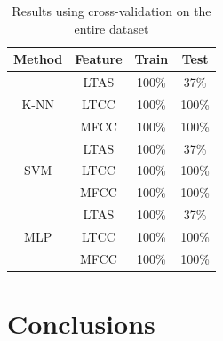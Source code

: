\documentclass[letterpaper,11pt,leqno]{article}
\newcommand{\bib}{bibliography.bib}
\begin{document}
\begin{table}[H]
	\caption{Results using cross-validation on the entire dataset}  
	\centering
		\begin{tabular}{c c c c}
			\textbf{Method} & \textbf{Feature} & \textbf{Train} & \textbf{Test} \\
			\hline\hline
			\multirow{3}{3em}{K-NN} & LTAS & 100\% & 37\% \\
			& LTCC & 100\% & 100\% \\
			& MFCC & 100\% & 100\% \\
			\hline
			\multirow{3}{3em}{SVM} & LTAS & 100\% & 37\% \\
			& LTCC & 100\% & 100\% \\
			& MFCC & 100\% & 100\% \\
			\hline
			\multirow{3}{3em}{MLP} & LTAS & 100\% & 37\% \\
			& LTCC & 100\% & 100\% \\
			& MFCC & 100\% & 100\% \\
			\hline
		\end{tabular}
	\end{table}

\section{Conclusions}\label{s:conclusions}




\end{document}
